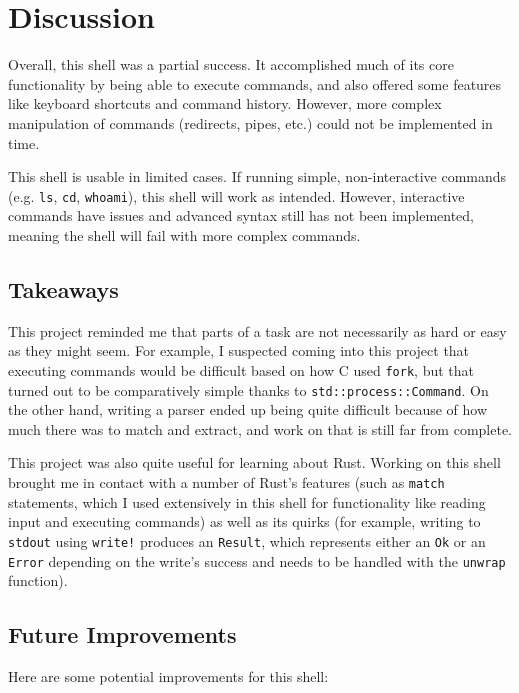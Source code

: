 \documentclass[12pt,twoside]{report} %
\begin{document}
	\chapter{Discussion} \label{discussion}
	Overall, this shell was a partial success. It accomplished much of its core functionality by being able to execute commands, and also offered some features like keyboard shortcuts and command history. However, more complex manipulation of commands (redirects, pipes, etc.) could not be implemented in time.
	
	This shell is usable in limited cases. If running simple, non-interactive commands (e.g. \verb|ls|, \verb|cd|, \verb|whoami|), this shell will work as intended. However, interactive commands have issues and advanced syntax still has not been implemented, meaning the shell will fail with more complex commands.
	
	\section{Takeaways} \label{sec:takeaways}
	This project reminded me that parts of a task are not necessarily as hard or easy as they might seem. For example, I suspected coming into this project that executing commands would be difficult based on how C used \verb|fork|, but that turned out to be comparatively simple thanks to \verb|std::process::Command|. On the other hand, writing a parser ended up being quite difficult because of how much there was to match and extract, and work on that is still far from complete.
	
    This project was also quite useful for learning about Rust. Working on this shell brought me in contact with a number of Rust's features (such as \verb|match| statements, which I used extensively in this shell for functionality like reading input and executing commands) as well as its quirks (for example, writing to \verb|stdout| using \verb|write!| produces an \verb|Result|, which represents either an \verb|Ok| or an \verb|Error| depending on the write's success and needs to be handled with the \verb|unwrap| function).
	
	\section{Future Improvements} \label{sec:future-improvements}
	Here are some potential improvements for this shell:
	
\end{document}

